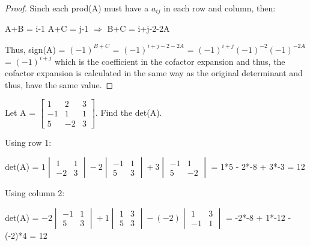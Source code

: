 \begin{proof}
        Sinch each prod(A) must have a $a_{ij}$ in each row and column, then:

        \hspace{0.5cm}
        A+B = i-1
        \hspace{1cm}
        A+C = j-1
        \hspace{1cm}
        $\Rightarrow$
        \hspace{1cm}
        B+C = i+j-2-2A

        Thus, sign(A) = $(-1)^{B+C}$ = $(-1)^{i+j-2-2A}$
        = $(-1)^{i+j}(-1)^{-2}(-1)^{-2A}$
        = $(-1)^{i+j}$
        which is the coefficient in the cofactor expansion
        and thus, the cofactor expansion is calculated in the same way
        as the original determinant and thus, have the same value.
    \end{proof}

    \newpage



    \begin{example}
        Let A =
        $
        \begin{bmatrix}
            1 & 2 & 3 \\
            -1 & 1 & 1 \\
            5 & -2 & 3 
        \end{bmatrix}
        $.
        Find the det(A).
    \end{example}

    \begin{tbox}
        Using row 1:

        \hspace{0.5cm}
        det(A) =
        $
        1\begin{vmatrix}
            1 & 1 \\
            -2 & 3
        \end{vmatrix} -
        2\begin{vmatrix}
            -1 & 1 \\
            5 & 3
        \end{vmatrix} +
        3\begin{vmatrix}
            -1 & 1 \\
            5 & -2
        \end{vmatrix}
        $
        = 1*5 - 2*-8 + 3*-3
        = 12

        Using column 2:

        \hspace{0.5cm}
        det(A) =
        $
        -2\begin{vmatrix}
            -1 & 1 \\
            5 & 3
        \end{vmatrix} +
        1\begin{vmatrix}
            1 & 3 \\
            5 & 3
        \end{vmatrix} -
        (-2)\begin{vmatrix}
            1 & 3 \\
            -1 & 1
        \end{vmatrix}
        $
        = -2*-8 + 1*-12 - (-2)*4
        = 12
    \end{tbox}


